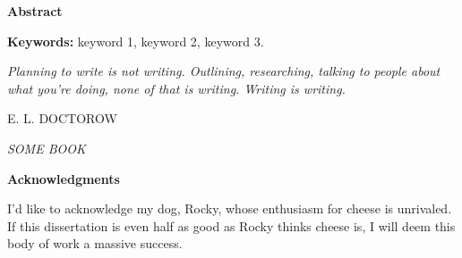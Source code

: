 
\begin{preliminary}

\maketitle
\newpage


\setcounter{page}{2}
\Large\begin{center}\textbf{Abstract}\end{center}\normalsize
%

\vfill
\noindent\textbf{Keywords:} keyword 1, keyword 2, keyword 3.
\newpage




\clearpage

\thispagestyle{empty}
\null\vfill
{
	\settowidth{}
	\centering
	\hspace{3cm}\parbox{\longest}{%
		\raggedright{\Large\itshape%
      Planning to write is not writing. Outlining, researching, talking to people about what you're doing, none of that is writing. Writing is writing.\par\bigskip
		}   
		\raggedleft\MakeUppercase{E. L. Doctorow}\par%
		\raggedleft\MakeUppercase{\textit{Some book}}\par%
}}

\vfill\vfill

\newpage


\Large\begin{center}\textbf{Acknowledgments}\end{center}\normalsize
%
I'd like to acknowledge my dog, Rocky, whose enthusiasm for cheese is unrivaled. If this dissertation is even half as good as Rocky thinks cheese is, I will deem this body of work a massive success.

\vfill
\newpage
\singlespacing




\end{preliminary}
